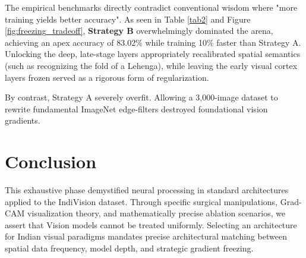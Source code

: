 \documentclass[12pt]{article}
\begin{document}
The empirical benchmarks directly contradict conventional wisdom where "more training yields better accuracy". As seen in Table \ref{tab2} and Figure \ref{fig:freezing_tradeoff}, \textbf{Strategy B} overwhelmingly dominated the arena, achieving an apex accuracy of 83.02\% while training 10\% faster than Strategy A. Unlocking the deep, late-stage layers appropriately recalibrated spatial semantics (such as recognizing the fold of a Lehenga), while leaving the early visual cortex layers frozen served as a rigorous form of regularization. 

By contrast, Strategy A severely overfit. Allowing a 3,000-image dataset to rewrite fundamental ImageNet edge-filters destroyed foundational vision gradients. 

\section{Conclusion}
This exhaustive phase demystified neural processing in standard architectures applied to the IndiVision dataset. Through specific surgical manipulations, Grad-CAM visualization theory, and mathematically precise ablation scenarios, we assert that Vision models cannot be treated uniformly. Selecting an architecture for Indian visual paradigms mandates precise architectural matching between spatial data frequency, model depth, and strategic gradient freezing. 
\end{document}
